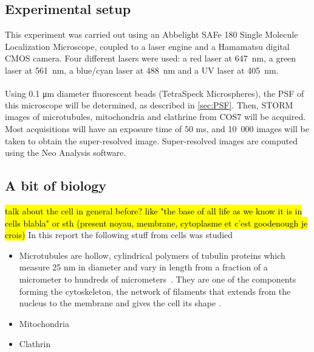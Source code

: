 \subsection{Experimental setup} \label{sec:experimental_setup}
This experiment was carried out using an Abbelight SAFe 180 Single Molecule Localization Microscope, coupled to a laser engine and a Hamamatsu digital CMOS camera. Four different lasers were used: a red laser at \mbox{647 nm}, a green laser at \mbox{561 nm}, a blue/cyan laser at \mbox{488 nm} and a UV laser at \mbox{405 nm}.

Using 0.1 \si{\micro\meter} diameter fluorescent beads (TetraSpeck\textsuperscript{\texttrademark} Microspheres), the PSF of this microscope will be determined, as described in \autoref{sec:PSF}. Then, STORM images of microtubules, mitochondria and clathrine from COS7 will be acquired. Most acquisitions will have an exposure time of $50$ ms, and \mbox{10 000} images will be taken to obtain the super-resolved image. Super-resolved images are computed using the Neo Analysis software.

\subsection{A bit of biology} \label{sec:biology}
\hl{talk about the cell in general before? like "the base of all life as we know it is in cells blabla" or sth (present noyau, membrane, cytoplasme et c'est goodenough je crois)}
In this report the following stuff from cells was studied
\begin{itemize}
    \item Microtubules are hollow, cylindrical polymers of tubulin proteins which measure 25 nm
    in diameter and vary in length from a fraction of a micrometer to hundreds of \mbox{micrometers \cite{lodish_molecular_2004}.}
    They are one of the components forming the cytoskeleton, the network of filaments that extends from the nucleus to the membrane and gives the cell its shape \cite{douglass_notice_2023}.
    \item Mitochondria
    \item Clathrin
\end{itemize}
